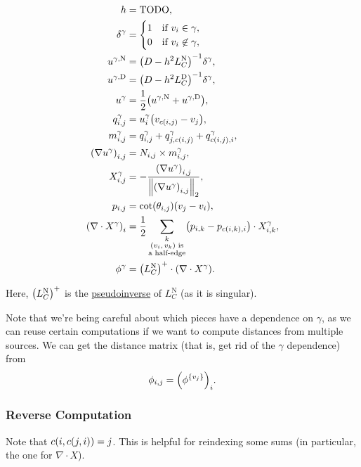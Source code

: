 \begin{align*}
	h &= \text{TODO}, \\
	\delta^\gamma &= \begin{cases}
		1 & \text{if \(v_i \in \gamma\)}, \\
		0 & \text{if \(v_i \not\in \gamma\)},
	\end{cases} \\
	u^{\gamma, \text{N}} &= \pof{D - h^2L_C^{\text{N}}}^{-1}\delta^\gamma, \\
	u^{\gamma, \text{D}} &= \pof{D - h^2L_C^{\text{D}}}^{-1}\delta^\gamma, \\
	u^\gamma &= \frac{1}{2}\pof{u^{\gamma, \text{N}} + u^{\gamma, \text{D}}}, \\
	q^\gamma_{i, j} &= u^\gamma_i\pof{v_{c\pof{i, j}} - v_j}, \\
	m^\gamma_{i, j} &= q^\gamma_{i, j} + q^\gamma_{j, c\pof{i, j}} + q^\gamma_{c\pof{i, j}, i}, \\
	\pof{\nabla u^\gamma}_{i, j} &= N_{i, j} \times m^\gamma_{i, j}, \\
	X^\gamma_{i, j} &= -\frac{\pof{\nabla u^\gamma}_{i, j}}{\norm{\pof{\nabla u^\gamma}_{i, j}}_2}, \\
	p_{i, j} &= \cot\pof{\theta_{i, j}}\pof{v_j - v_i}, \\
	\pof{\nabla \cdot X^\gamma}_i &= \frac{1}{2}\sum_{\substack{k \\ \text{\(\pof{v_i, v_k}\) is} \\ \text{a half-edge}}}\pof{p_{i, k} - p_{c\pof{i, k}, i}} \cdot X^\gamma_{i, k}, \\
	\phi^\gamma &= \pof{L_C^{\text{N}}}^+ \cdot \pof{\nabla \cdot X^\gamma}.
\end{align*}

Here, \(\pof{L_C^{\text{N}}}^+\) is the \href{https://en.wikipedia.org/wiki/Moore%E2%80%93Penrose_inverse}{pseudoinverse} of \(L_C^{\text{N}}\) (as it is singular).

Note that we're being careful about which pieces have a dependence on \(\gamma\), as we can reuse certain computations if we want to compute distances from multiple sources. We can get the distance matrix (that is, get rid of the \(\gamma\) dependence) from \[\phi_{i, j} = \pof{\phi^{\cof{v_j}}}_i.\]

\subsubsection{Reverse Computation}

Note that \(c\pof{i, c\pof{j, i}} = j\). This is helpful for reindexing some sums (in particular, the one for \(\nabla \cdot X\)).

